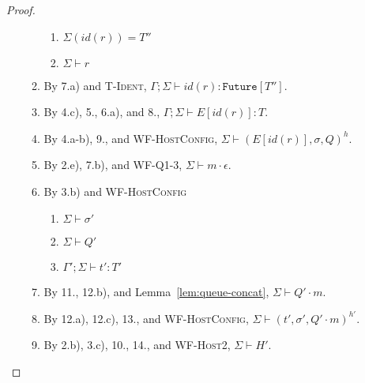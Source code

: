 \begin{proof}
\begin{itemize}
\begin{enumerate}
  \begin{enumerate}[label=(\alph*)]
  \item $\Sigma(id(r)) = T''$
  \item $\Sigma \vdash r$
  \end{enumerate}
\item By 7.a) and \textsc{T-Ident}, $\Gamma ; \Sigma \vdash id(r) : \texttt{Future}[T'']$.
\item By 4.c), 5., 6.a), and 8., $\Gamma ; \Sigma \vdash E[id(r)] : T$.
\item By 4.a-b), 9., and \textsc{WF-HostConfig}, $\Sigma \vdash (E[id(r)], \sigma, Q)^h$.
\item By 2.e), 7.b), and \textsc{WF-Q1-3}, $\Sigma \vdash m \cdot \epsilon$.
\item By 3.b) and \textsc{WF-HostConfig}
  \begin{enumerate}[label=(\alph*)]
  \item $\Sigma \vdash \sigma'$
  \item $\Sigma \vdash Q'$
  \item $\Gamma' ; \Sigma \vdash t' : T'$
  \end{enumerate}
\item By 11., 12.b), and Lemma~\ref{lem:queue-concat}, $\Sigma \vdash Q' \cdot m$.
\item By 12.a), 12.c), 13., and \textsc{WF-HostConfig}, $\Sigma \vdash (t', \sigma', Q' \cdot m)^{h'}$.
\item By 2.b), 3.c), 10., 14., and \textsc{WF-Host2}, $\Sigma \vdash H'$.
\end{enumerate}


\end{itemize}
\end{proof}
